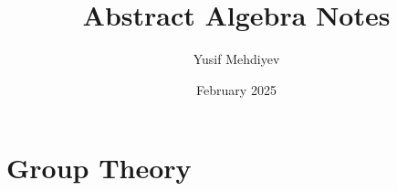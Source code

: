 \documentclass[11pt]{scrreprt}
\begin{document}
\renewcommand{\figurename}{Image}

\title{Abstract Algebra Notes}
\author{Yusif Mehdiyev}
\date{February 2025}
\maketitle

\tableofcontents
\part{Group Theory}

\end{document}

